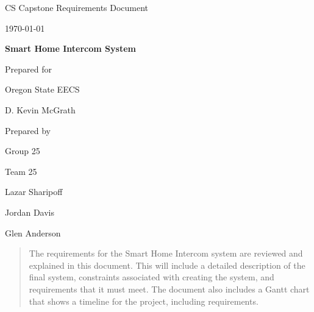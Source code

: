 \documentclass[onecolumn, draftclsnofoot,10pt, compsoc]{IEEEtran}
\def \CapstoneTeamName{		Team 25}
\def \CapstoneTeamNumber{		25}
\def \GroupMemberOne{			Lazar Sharipoff}
\def \GroupMemberTwo{			Jordan Davis}
\def \GroupMemberThree{			Glen Anderson}
\def \CapstoneProjectName{		Smart Home Intercom System}
\def \CapstoneSponsorCompany{	Oregon State EECS}
\def \CapstoneSponsorPerson{		D. Kevin McGrath}
\def \DocType{		%
				Requirements Document
				}
\newcommand{\NameSigPair}[1]{\par
\makebox[2.75in][r]{#1} \hfil 	\makebox[3.25in]{\makebox[2.25in]{\hrulefill} \hfill		\makebox[.75in]{\hrulefill}}
\par\vspace{-12pt} \textit{\tiny\noindent
\makebox[2.75in]{} \hfil		\makebox[3.25in]{\makebox[2.25in][r]{Signature} \hfill	\makebox[.75in][r]{Date}}}}
\renewcommand{\NameSigPair}[1]{#1}
\begin{document}
\begin{titlepage}
    \begin{singlespace}
        \hfill 
        \par\vspace{.2in}
        \centering
        \scshape{
            \huge CS Capstone \DocType \par
            {\large\today}\par
            \vspace{.5in}
            \textbf{\Huge\CapstoneProjectName}\par
            \vfill
            {\large Prepared for}\par
            \Huge \CapstoneSponsorCompany\par
            \vspace{5pt}
            {\Large\NameSigPair{\CapstoneSponsorPerson}\par}
            {\large Prepared by }\par
            Group\CapstoneTeamNumber\par
            \CapstoneTeamName\par 
            \vspace{5pt}
            {\Large
                \NameSigPair{\GroupMemberOne}\par
                \NameSigPair{\GroupMemberTwo}\par
                \NameSigPair{\GroupMemberThree}\par
            }
            \vspace{20pt}
        }
        \begin{abstract}
        	The requirements for the Smart Home Intercom system are reviewed and explained in this document. This will include a detailed description of the final system, constraints associated with creating the system, and requirements that it must meet. The document also includes a Gantt chart that shows a timeline for the project, including requirements.  
        \end{abstract}     
    \end{singlespace}
\end{titlepage}
\newpage
{}
\tableofcontents
\listoftables
\clearpage
\end{document}
